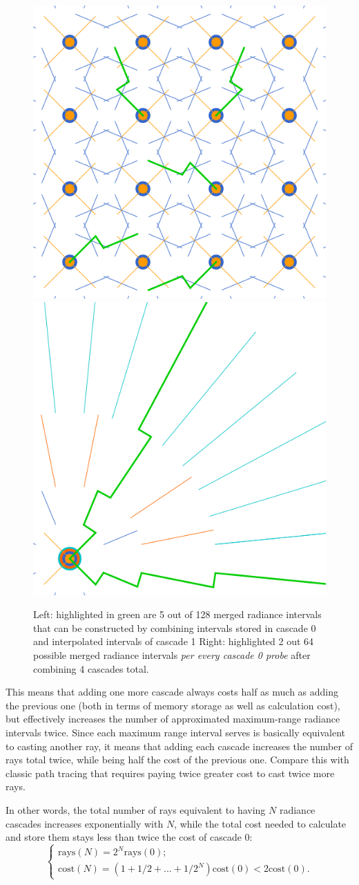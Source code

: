 \documentclass{jcgt}
\begin{document}
\begin{figure}[htb]
  \centering
  \includegraphics[width=0.49\columnwidth]{images/cascade 1 on 0 rays.png}
  \includegraphics[width=0.49\columnwidth]{images/max rays.png}
  \caption{\label{fig:cascades}
     Left: highlighted in green are 5 out of 128 merged radiance intervals that can be constructed by combining intervals stored in cascade 0 and interpolated intervals of cascade 1 Right: highlighted 2 out 64 possible merged radiance intervals \emph{per every cascade 0 probe} after combining 4 cascades total.}
\end{figure}
%

This means that adding one more cascade always costs half as much as adding the previous one (both in terms of memory storage as well as calculation cost), but effectively increases the number of approximated maximum-range radiance intervals twice. Since each maximum range interval serves is basically equivalent to casting another ray, it means that adding each cascade increases the number of rays total twice, while being half the cost of the previous one. Compare this with classic path tracing that requires paying twice greater cost to cast twice more rays.

In other words, the total number of rays equivalent to having $N$ radiance cascades increases exponentially with $N$, while the total cost needed to calculate and store them stays less than twice the cost of cascade 0:
\begin{equation}
  \begin{cases}
    \text{rays}(N) = 2^N\text{rays}(0); \\
    \text{cost}(N) = (1+1/2+...+1/2^N)\text{cost}(0)<2\text{cost}(0).
  \end{cases}
  \label{eq:scaling}
\end{equation}
\end{document}
